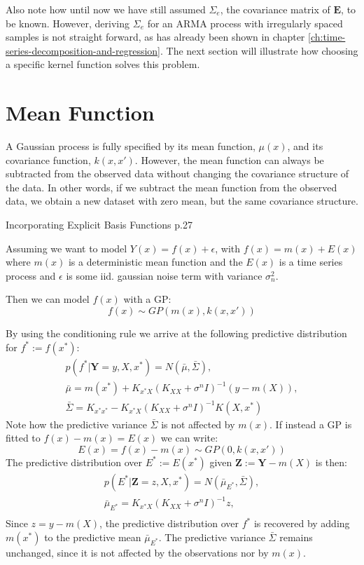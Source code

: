 Also note how until now we have still assumed $\Sigma_e$, the covariance matrix of $\mathbf{E}$, to be known.
However, deriving $\Sigma_e$ for an ARMA process with irregularly spaced samples is not straight forward, as has already
been shown in chapter \ref{ch:time-series-decomposition-and-regression}.
The next section will illustrate how choosing a specific kernel function solves this problem.

\section{Mean Function}\label{subsec:mean-function}


A Gaussian process is fully specified by its mean function, $\mu(x)$, and its covariance
function, $k(x, x')$.
However, the mean function can always be subtracted from the observed data without changing
the covariance structure of the data. In other words, if we subtract the mean function from the
observed data, we obtain a new dataset with zero mean, but the same covariance structure.


Incorporating Explicit Basis Functions \citeauthor{rasmussen_gaussian_2006} p.27


Assuming we want to model $Y(x) = f(x) + \epsilon$, with $f(x) = m(x) + E(x)$ where $m(x)$ is a deterministic mean function
and the $E(x)$ is a time series process and $\epsilon$ is some iid. gaussian noise term with variance $\sigma_n^{2}$.
%

Then we can model $f(x)$ with a GP:
$$ f(x) \sim GP(m(x), k(x,x'))$$

By using the conditioning rule we arrive at the following predictive distribution for $f^{\ast} := f(x^{\ast})$:
\begin{gather*}
    p(f^{\ast}| \mathbf{Y}= y, X, x^{\ast}) = N(\bar{\mu}, \bar{\Sigma}), \\
    \bar{\mu} = m(x^{\ast}) + K_{x^{\ast}X} (K_{XX} + \sigma^{n} I )^{-1}(y - m(X)),\\
    \bar{\Sigma} = K_{x^{\ast}x^{\ast}} - K_{x^{\ast}X} (K_{XX} + \sigma^{n} I )^{-1} K(X, x^{\ast})
\end{gather*}
Note how the predictive variance $\bar{\Sigma}$ is not affected by $m(x)$.
If instead a GP is fitted to $f(x) - m(x) = E(x)$ we can write:
$$ E(x) = f(x) - m(x) \sim GP(0, k(x,x'))$$
The predictive distribution over $E^{\ast} := E(x^{\ast})$ given $\mathbf{Z} := \mathbf{Y} - m(X)$ is then:
\begin{gather*}
    p(E^{\ast}| \mathbf{Z} = z, X, x^{\ast}) = N(\bar{\mu}_{E^{\ast}}, \bar{\Sigma}), \\
    \bar{\mu}_{E^{\ast}} = K_{x^{\ast}X} (K_{XX} + \sigma^{n} I )^{-1} z,\\
\end{gather*}
Since $ z = y - m(X)$, the predictive distribution over $f^{\ast}$ is recovered by adding $m(x^{\ast})$ to
the predictive mean $\bar{\mu}_{E^{\ast}}$. The predictive variance $\bar{\Sigma}$ remains unchanged,
since it is not affected by the observations nor by $m(x)$.


